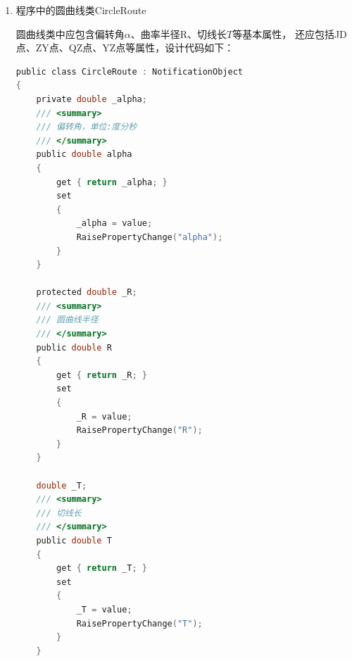 \begin{enumerate}
          \begin{lstlisting}[language=C]
public class GPoint : NotificationObject
{
    //......类中其它代码......

    /// <summary>
    /// 将double类型的kno分解为K5+200.00形式的里程桩号
    /// </summary>
    /// <returns>里程桩号</returns>
    public string OutKNoInfo()
    {
        int k = (int)(_kno / 1000);
        double klength = _kno - k * 1000;
        return string.Format("K{0}+{1:0.000}", k, klength);
    }
}
\end{lstlisting}

          以上代码的逻辑非常简单，double类型的里程除以1000，取出公里数，
          然后将不足整公里数的部分再取出，然后组合成形如``K5+200.00''这样的
          字符串输出。

          由于以上代码只涉及类中的 \_kno 字段，因此也可以写成如下的只读属性字段，
          调用会更加方便。

          \begin{lstlisting}[language=C]
public class GPoint : NotificationObject
{
    //......类中其它代码......

    /// <summary>
    /// 将double类型的kno分解为K5+200.00形式的里程桩号
    /// </summary>
    public string KNoInfo
    {
        get｛
            int k = (int)(_kno / 1000);
            double klength = _kno - k * 1000;
            return string.Format("K{0}+{1:0.000}", k, klength);
        ｝
    }
}
\end{lstlisting}

    \item 程序中的圆曲线类CircleRoute

          圆曲线类中应包含偏转角$\alpha$、曲率半径R、切线长$T$等基本属性，
          还应包括JD点、ZY点、QZ点、YZ点等属性，设计代码如下：

          \begin{lstlisting}[language=C]
public class CircleRoute : NotificationObject
{
    private double _alpha;
    /// <summary>
    /// 偏转角，单位:度分秒
    /// </summary>
    public double alpha
    {
        get { return _alpha; }
        set
        {
            _alpha = value;
            RaisePropertyChange("alpha");
        }
    }

    protected double _R;
    /// <summary>
    /// 圆曲线半径
    /// </summary>
    public double R
    {
        get { return _R; }
        set
        {
            _R = value;
            RaisePropertyChange("R");
        }
    }

    double _T;
    /// <summary>
    /// 切线长
    /// </summary>
    public double T
    {
        get { return _T; }
        set
        {
            _T = value;
            RaisePropertyChange("T");
        }
    }


\end{lstlisting}
\end{enumerate}
